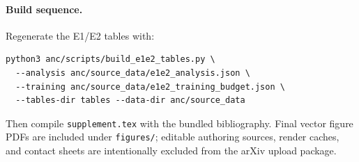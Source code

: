\documentclass[10pt]{article}
\newcommand{\apath}[1]{\begingroup\urlstyle{tt}\nolinkurl{#1}\endgroup}
\begin{document}
\paragraph{Build sequence.}
Regenerate the E1/E2 tables with:
\begin{lstlisting}[style=gcpdsl]
python3 anc/scripts/build_e1e2_tables.py \
  --analysis anc/source_data/e1e2_analysis.json \
  --training anc/source_data/e1e2_training_budget.json \
  --tables-dir tables --data-dir anc/source_data
\end{lstlisting}
Then compile \apath{supplement.tex} with the bundled bibliography. Final vector figure PDFs are included under \apath{figures/}; editable authoring sources, render caches, and contact sheets are intentionally excluded from the arXiv upload package.



\end{document}
